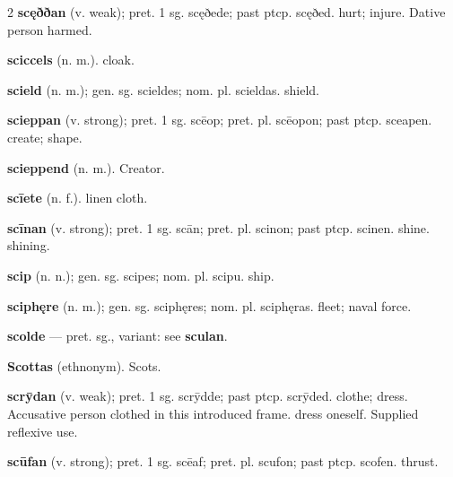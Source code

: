 \begin{multicols*}{2}
\textbf{scęððan} (v. weak); pret. 1 sg. scęðede; past ptcp. scęðed. hurt; injure. Dative person harmed.\par
\textbf{sciccels} (n. m.). cloak.\par
\textbf{scield} (n. m.); gen. sg. scieldes; nom. pl. scieldas. shield.\par
\textbf{scieppan} (v. strong); pret. 1 sg. scēop; pret. pl. scēopon; past ptcp. sceapen. create; shape.\par
\textbf{scieppend} (n. m.). Creator.\par
\textbf{scīete} (n. f.). linen cloth.\par
\textbf{scīnan} (v. strong); pret. 1 sg. scān; pret. pl. scinon; past ptcp. scinen. shine. shining.\par
\textbf{scip} (n. n.); gen. sg. scipes; nom. pl. scipu. ship.\par
\textbf{sciphęre} (n. m.); gen. sg. sciphęres; nom. pl. sciphęras. fleet; naval force.\par
\textbf{scolde} — pret. sg., variant: see \textbf{sculan}.\par
\textbf{Scottas} (ethnonym). Scots.\par
\textbf{scrȳdan} (v. weak); pret. 1 sg. scrȳdde; past ptcp. scrȳded. clothe; dress. Accusative person clothed in this introduced frame. dress oneself. Supplied reflexive use.\par
\textbf{scūfan} (v. strong); pret. 1 sg. scēaf; pret. pl. scufon; past ptcp. scofen. thrust.\par

\end{multicols*}

